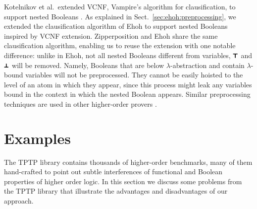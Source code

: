 Kotelnikov et al.\ extended VCNF, Vampire's algorithm for clausification, to support
nested Booleans \cite{kotelnikov-16-fool}. As explained in Sect.~\ref{sec:ehoh:preprocessing}, we extended
the clausification algorithm of Ehoh to support nested Booleans inspired by VCNF extension.
Zipperposition and Ehoh share the
same clausification algorithm, enabling us to reuse the extension with one
notable difference:
unlike in Ehoh, not all nested Booleans different from variables, $\pmb{\top}$ and $\pmb{\bot}$
will be removed. Namely, Booleans that are below $\lambda$-abstraction
and contain $\lambda$-bound variables will not be preprocessed. They cannot be easily hoisted to the level of an atom in which
they appear, since this process might leak any variables bound in the context
in which the nested Boolean appears. Similar preprocessing techniques are used in other higher-order provers
\cite{wskb-16-effective-norm}.

\section{Examples}
\label{sect:bool:examples}

The TPTP library contains thousands of higher-order benchmarks, many of them hand-crafted
to point out subtle interferences of functional and Boolean properties of higher order logic. In this section
we discuss some problems from the TPTP library that illustrate the advantages and disadvantages
of our approach.

